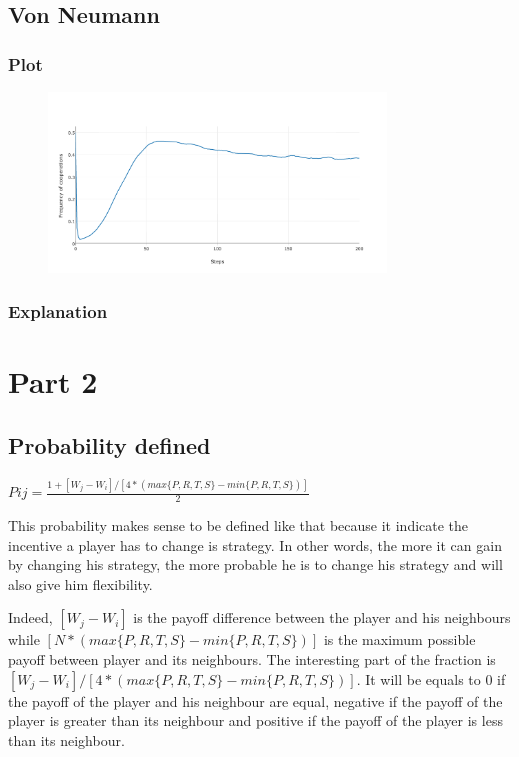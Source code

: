 \documentclass[11pt]{article}
\begin{document}
\subsection{Von Neumann}

\subsubsection{Plot}
\begin{figure}[H]
\centering
   \includegraphics[width=0.8\textwidth]{img/part1/cf-vonn-notmyselfincluded.png}
\end{figure}

\subsubsection{Explanation}
 
\section{Part 2}

\subsection{Probability defined}

$Pij = \frac{1 + [W_j-W_i]/[4*(max\{P,R,T,S\} - min\{P,R,T,S\})]}{2}$ 

This probability makes sense to be defined like that because it indicate the incentive a player has to change is strategy. In other words, the more it can gain by changing his strategy, the more probable he is to change his strategy and will also give him flexibility. 

Indeed, $[W_j-W_i]$ is the payoff difference between the player and his neighbours while $ [N*(max\{P,R,T,S\} - min\{P,R,T,S\})]$ is the maximum possible payoff between player and its neighbours. The interesting part of the fraction is $[W_j-W_i]/[4*(max\{P,R,T,S\} - min\{P,R,T,S\})]$. It will be equals to 0 if the payoff of the player and his neighbour are equal, negative if the payoff of the player is greater than its neighbour and positive if the payoff of the player is less than its neighbour.
\end{document}

